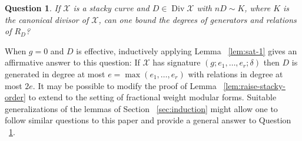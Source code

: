 \documentclass{amsart}
\theoremstyle{plain}
\newtheorem{question}[thm]{Question}
\theoremstyle{definition}
\theoremstyle{remark}
\numberwithin{equation}{section}
\DeclareMathOperator\di{Div}
\newcommand\sx{\mathscr X}
\begin{document}
\begin{enumerate}
\begin{question}
		\label{ques:fractional-weight}
			If $\sx$ is a stacky curve and $D \in \di \sx$ with $nD \sim K$, 
			where $K$ is the canonical divisor of $\sx$, can one bound the 
			degrees of generators and relations of $R_D$?
		\end{question}
		When $g=0$ and $D$ is effective, inductively applying Lemma ~\ref{lem:sat-1}  
		gives an affirmative answer to this question: If $\sx$ has signature 
		$(g; e_1, \ldots, e_r; \delta)$ then $D$ is generated in degree at 
		most $e = \max(e_1, \ldots, e_r)$ with relations in degree at most
		$2e$. 
		It may be possible to modify the proof of Lemma
		~\ref{lem:raise-stacky-order} to extend to the setting of fractional 
		weight modular forms. 
		Suitable generalizations of the 
		lemmas of Section ~\ref{sec:induction} might allow one to 
		follow similar questions to this paper and provide a general 
		answer to Question ~\ref{ques:fractional-weight}.



\end{enumerate}
\end{document}
